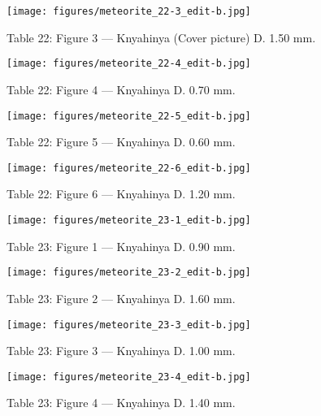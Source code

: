 \documentclass[a4paper, 12pt, oneside]{article}
\begin{document}
\clearpage
\begin{figure}[t]
\texttt{[image: figures/meteorite\_22-3\_edit-b.jpg]}
\caption{Table 22: Figure 3 --- Knyahinya (Cover picture) D. 1.50 mm.}
\centering
\end{figure}
\clearpage
\begin{figure}[t]
\texttt{[image: figures/meteorite\_22-4\_edit-b.jpg]}
\caption{Table 22: Figure 4 --- Knyahinya D. 0.70 mm.}
\centering
\end{figure}
\clearpage
\begin{figure}[t]
\texttt{[image: figures/meteorite\_22-5\_edit-b.jpg]}
\caption{Table 22: Figure 5 --- Knyahinya D. 0.60 mm.}
\centering
\end{figure}
\clearpage
\begin{figure}[t]
\texttt{[image: figures/meteorite\_22-6\_edit-b.jpg]}
\caption{Table 22: Figure 6 --- Knyahinya D. 1.20 mm.}
\centering
\end{figure}
\clearpage
{}
\begin{figure}[t]
\texttt{[image: figures/meteorite\_23-1\_edit-b.jpg]}
\caption{Table 23: Figure 1 --- Knyahinya D. 0.90 mm.}
\centering
\end{figure}
\clearpage
\begin{figure}[t]
\texttt{[image: figures/meteorite\_23-2\_edit-b.jpg]}
\caption{Table 23: Figure 2 --- Knyahinya D. 1.60 mm.}
\centering
\end{figure}
\clearpage
\begin{figure}[t]
\texttt{[image: figures/meteorite\_23-3\_edit-b.jpg]}
\caption{Table 23: Figure 3 --- Knyahinya D. 1.00 mm.}
\centering
\end{figure}
\clearpage
\begin{figure}[t]
\texttt{[image: figures/meteorite\_23-4\_edit-b.jpg]}
\caption{Table 23: Figure 4 --- Knyahinya D. 1.40 mm.}
\centering
\end{figure}
\end{document}
